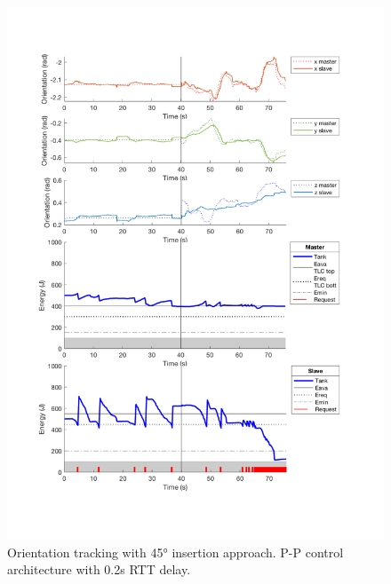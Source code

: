 \begin{center}
	\begin{figure}
		\includegraphics[width=\textwidth, keepaspectratio]{plots/pp45Delay/Orientation.pdf}
		\caption{Orientation tracking with 45° insertion approach. P-P control architecture with 0.2s RTT delay.}
		\label{graph:pp45Delay/Orientation}
	\end{figure}
\end{center}
